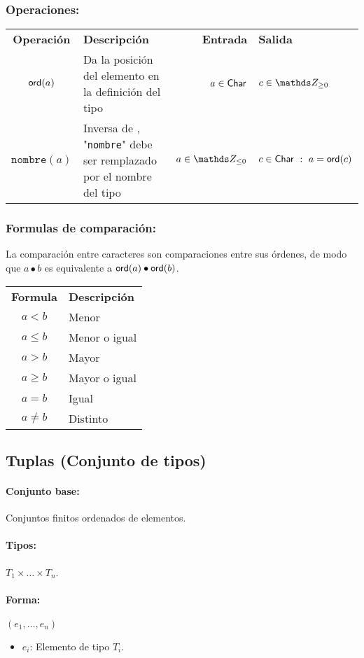 \subsubsection*{Operaciones:}
\begin{tabular}{cp{6cm}rl}
	\textbf{Operación} & \textbf{Descripción} & \textbf{Entrada} & \textbf{Salida} \\
	$\mathsf{ord}(a)$ &  Da la posición del elemento en la definición del tipo & $a \in \mathsf{Char}$ & $c\in\ent_{\geq0}$\\
	$\texttt{nombre}(a)$ &  Inversa de \ord{}, "\texttt{nombre}" debe ser remplazado por el nombre del tipo & $a \in \ent_{\leq 0}$ & $c\in\mathsf{Char}~:~ a = \mathsf{ord}(c)$\\
\end{tabular}

\subsubsection*{Formulas de comparación:}
La comparación entre caracteres son comparaciones entre sus órdenes, de modo que $a \bullet b$ es equivalente a $\mathsf{ord}(a)\bullet\mathsf{ord}(b)$.

\vspace*{2mm}
\begin{tabular}{cl}
	\textbf{Formula} & \textbf{Descripción} \\
	$a<b$ &  Menor \\
	$a\leq b$ &  Menor o igual\\
	$a > b$ &  Mayor \\
	$a \geq b$ & Mayor o igual \\
	$a = b$ & Igual\\
	$a \neq b$ & Distinto \\
\end{tabular}

\subsection{Tuplas (Conjunto de tipos)}
\paragraph{Conjunto base:} Conjuntos finitos ordenados de elementos.
\paragraph{Tipos:} $T_1\times\dots\times T_n$.
\paragraph{Forma:}
\begin{center}
	$( e_1,\dots,e_n)$
\end{center}
\begin{itemize}
	\item $e_i$: Elemento de tipo $T_i$.
\end{itemize}

